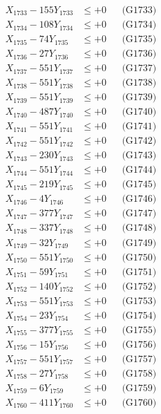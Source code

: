 \documentclass[a4paper,10pt]{article}
\begin{document}
{\begin{align}
X_{1733} - 155Y_{1733} &\leq +0 && \text{(G1733)} \\
X_{1734} - 108Y_{1734} &\leq +0 && \text{(G1734)} \\
X_{1735} - 74Y_{1735} &\leq +0 && \text{(G1735)} \\
X_{1736} - 27Y_{1736} &\leq +0 && \text{(G1736)} \\
X_{1737} - 551Y_{1737} &\leq +0 && \text{(G1737)} \\
X_{1738} - 551Y_{1738} &\leq +0 && \text{(G1738)} \\
X_{1739} - 551Y_{1739} &\leq +0 && \text{(G1739)} \\
X_{1740} - 487Y_{1740} &\leq +0 && \text{(G1740)} \\
\allowbreak
X_{1741} - 551Y_{1741} &\leq +0 && \text{(G1741)} \\
X_{1742} - 551Y_{1742} &\leq +0 && \text{(G1742)} \\
X_{1743} - 230Y_{1743} &\leq +0 && \text{(G1743)} \\
X_{1744} - 551Y_{1744} &\leq +0 && \text{(G1744)} \\
X_{1745} - 219Y_{1745} &\leq +0 && \text{(G1745)} \\
X_{1746} - 4Y_{1746} &\leq +0 && \text{(G1746)} \\
X_{1747} - 377Y_{1747} &\leq +0 && \text{(G1747)} \\
X_{1748} - 337Y_{1748} &\leq +0 && \text{(G1748)} \\
X_{1749} - 32Y_{1749} &\leq +0 && \text{(G1749)} \\
X_{1750} - 551Y_{1750} &\leq +0 && \text{(G1750)} \\
\allowbreak
X_{1751} - 59Y_{1751} &\leq +0 && \text{(G1751)} \\
X_{1752} - 140Y_{1752} &\leq +0 && \text{(G1752)} \\
X_{1753} - 551Y_{1753} &\leq +0 && \text{(G1753)} \\
X_{1754} - 23Y_{1754} &\leq +0 && \text{(G1754)} \\
X_{1755} - 377Y_{1755} &\leq +0 && \text{(G1755)} \\
X_{1756} - 15Y_{1756} &\leq +0 && \text{(G1756)} \\
X_{1757} - 551Y_{1757} &\leq +0 && \text{(G1757)} \\
X_{1758} - 27Y_{1758} &\leq +0 && \text{(G1758)} \\
X_{1759} - 6Y_{1759} &\leq +0 && \text{(G1759)} \\
X_{1760} - 411Y_{1760} &\leq +0 && \text{(G1760)} \\

\end{align}}
\end{document}
